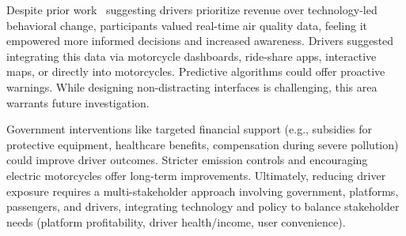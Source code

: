\documentclass[sigconf,screen,natbib=true]{acmart}
\providecommand{\DIFaddbegin}{} %
\providecommand{\DIFaddend}{} %
\begin{document}
\DIFaddbegin {}



\DIFaddend {}
Despite prior work~\cite{tieanklin2024rideshare} suggesting drivers prioritize revenue over technology-led behavioral change, participants valued real-time air quality data, feeling it empowered more informed decisions and increased awareness.
Drivers suggested integrating this data via motorcycle dashboards, ride-share apps, interactive maps, or directly into motorcycles.
Predictive algorithms could offer proactive warnings.
While designing non-distracting interfaces is challenging, this area warrants future investigation.



Government interventions like targeted financial support (e.g., subsidies for protective equipment, healthcare benefits, compensation during severe pollution) could improve driver outcomes.
Stricter emission controls and encouraging electric motorcycles offer long-term improvements.
Ultimately, reducing driver exposure requires a multi-stakeholder approach involving government, platforms, passengers, and drivers, integrating technology and policy to balance stakeholder needs (platform profitability, driver health/income, user convenience).
\end{document}
